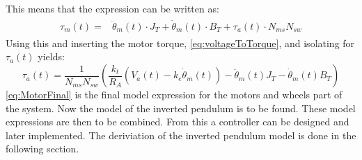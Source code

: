 This means that the expression can be written as:
\begin{align}
\begin{split}
\tau_m(t) = &\ddot\theta_m(t)\cdot J_T + \dot\theta_m(t) \cdot B_T + \tau_a(t)\cdot N_{ms} N_{sw}
\end{split}
\label{eq:tauM(t)3}
\end{align}
Using this and inserting the motor torque, \autoref{eq:voltageToTorque}, and isolating for $\tau_a(t)$ yields:
\begin{equation}
\tau_a(t) = \frac{1}{N_{ms} N_{sw}}\left(\frac{k_t}{R_A} \left( V_a(t) - k_e \dot\theta_m(t) \right) - \ddot\theta_m(t)J_{T} - \dot\theta_m(t)B_{T}\right) 
\label{eq:MotorFinal}
\end{equation}
\autoref{eq:MotorFinal} is the final model expression for the motors and wheels part of the system. Now the model of the inverted pendulum is to be found. These model expressions are then to be combined. From this a controller can be designed and later implemented. The deriviation of the inverted pendulum model is done in the following section. 
%
%
%
%
%
